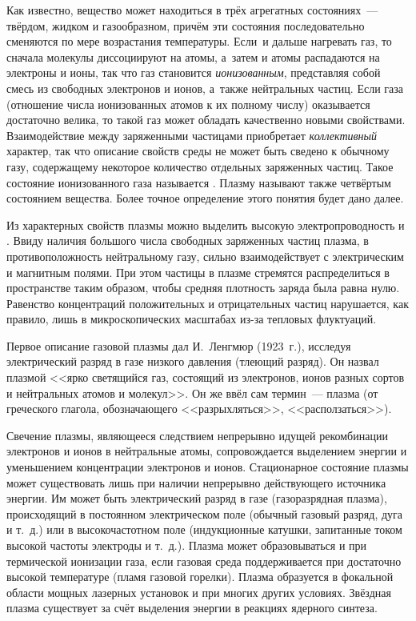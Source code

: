 
Как известно, вещество может находиться в трёх агрегатных состояниях~--- твёрдом,
жидком и газообразном, причём эти
состояния последовательно сменяются по мере возрастания температуры. Если~и
дальше нагревать газ, то сначала молекулы диссоциируют на атомы, а~затем и атомы
распадаются на электроны и ионы, так что газ становится \emph{ионизованным},
представляя собой смесь из свободных электронов и ионов, а~также нейтральных
частиц. Если  газа
(отношение числа ионизованных атомов к их полному числу) оказывается достаточно велика, то
такой газ может обладать качественно новыми свойствами.
Взаимодействие между заряженными частицами приобретает \emph{коллективный} характер,
так что описание свойств среды не может быть сведено к обычному газу,
содержащему некоторое количество отдельных заряженных частиц.
Такое состояние ионизованного газа называется .
Плазму называют также четвёртым состоянием вещества.
Более точное определение этого понятия будет дано далее.

Из характерных свойств плазмы можно выделить высокую электропроводность и
. Ввиду наличия большого числа свободных
заряженных частиц плазма, в противоположность нейтральному газу, сильно
взаимодействует с электрическим и магнитным полями.
При этом частицы в плазме стремятся распределиться в пространстве таким образом,
чтобы средняя плотность заряда была равна нулю. Равенство концентраций
положительных и отрицательных частиц нарушается, как правило,
лишь в микроскопических масштабах из-за тепловых флуктуаций.

Первое описание газовой плазмы дал И.~Ленгмюр (1923~г.), исследуя электрический
разряд в газе низкого давления (тлеющий разряд). Он назвал плазмой <<ярко
светящийся газ, состоящий из электронов, ионов разных сортов и нейтральных
атомов и молекул>>. Он же ввёл сам термин~--- плазма (от греческого глагола,
обозначающего <<разрыхляться>>, <<расползаться>>).

Свечение плазмы, являющееся следствием непрерывно идущей
рекомбинации электронов и ионов в нейтральные атомы, сопровождается выделением
энергии и уменьшением концентрации электронов и ионов. Стационарное состояние
плазмы может существовать лишь при наличии непрерывно действующего источника
энергии. Им может быть электрический разряд в газе (газоразрядная плазма),
происходящий в постоянном электрическом поле (обычный газовый разряд,
дуга и т.~д.) или в высокочастотном поле (индукционные катушки,
запитанные током высокой частоты электроды и т.~д.).
Плазма может образовываться и при термической ионизации газа, если газовая среда
поддерживается при достаточно высокой температуре (пламя газовой
горелки). Плазма образуется в фокальной области мощных лазерных установок и при
многих других условиях. Звёздная плазма существует за счёт выделения энергии
в реакциях ядерного синтеза.

